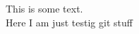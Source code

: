 \documentclass{article}
\begin{document}
This is some text.\\
Here I am just testig git stuff
\end{document}
